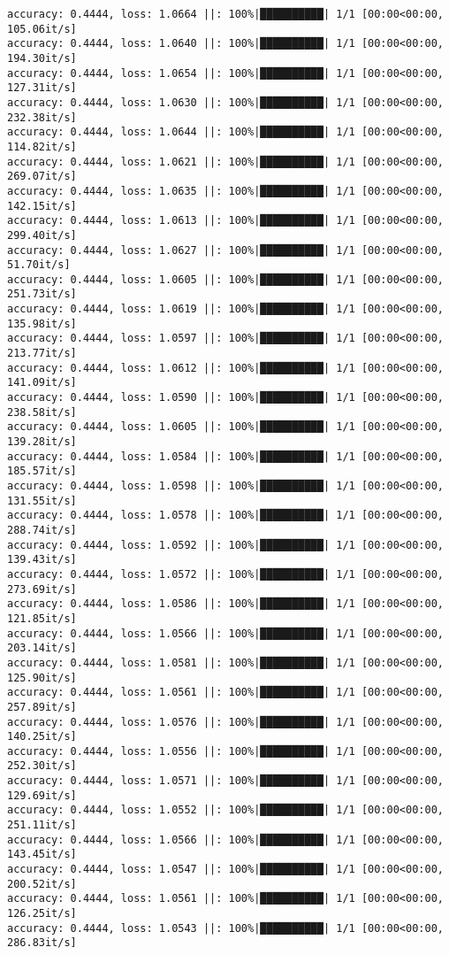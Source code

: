 \documentclass[
]{article}
\begin{document}
\begin{verbatim}
accuracy: 0.4444, loss: 1.0664 ||: 100%|██████████| 1/1 [00:00<00:00, 105.06it/s]
accuracy: 0.4444, loss: 1.0640 ||: 100%|██████████| 1/1 [00:00<00:00, 194.30it/s]
accuracy: 0.4444, loss: 1.0654 ||: 100%|██████████| 1/1 [00:00<00:00, 127.31it/s]
accuracy: 0.4444, loss: 1.0630 ||: 100%|██████████| 1/1 [00:00<00:00, 232.38it/s]
accuracy: 0.4444, loss: 1.0644 ||: 100%|██████████| 1/1 [00:00<00:00, 114.82it/s]
accuracy: 0.4444, loss: 1.0621 ||: 100%|██████████| 1/1 [00:00<00:00, 269.07it/s]
accuracy: 0.4444, loss: 1.0635 ||: 100%|██████████| 1/1 [00:00<00:00, 142.15it/s]
accuracy: 0.4444, loss: 1.0613 ||: 100%|██████████| 1/1 [00:00<00:00, 299.40it/s]
accuracy: 0.4444, loss: 1.0627 ||: 100%|██████████| 1/1 [00:00<00:00, 51.70it/s]
accuracy: 0.4444, loss: 1.0605 ||: 100%|██████████| 1/1 [00:00<00:00, 251.73it/s]
accuracy: 0.4444, loss: 1.0619 ||: 100%|██████████| 1/1 [00:00<00:00, 135.98it/s]
accuracy: 0.4444, loss: 1.0597 ||: 100%|██████████| 1/1 [00:00<00:00, 213.77it/s]
accuracy: 0.4444, loss: 1.0612 ||: 100%|██████████| 1/1 [00:00<00:00, 141.09it/s]
accuracy: 0.4444, loss: 1.0590 ||: 100%|██████████| 1/1 [00:00<00:00, 238.58it/s]
accuracy: 0.4444, loss: 1.0605 ||: 100%|██████████| 1/1 [00:00<00:00, 139.28it/s]
accuracy: 0.4444, loss: 1.0584 ||: 100%|██████████| 1/1 [00:00<00:00, 185.57it/s]
accuracy: 0.4444, loss: 1.0598 ||: 100%|██████████| 1/1 [00:00<00:00, 131.55it/s]
accuracy: 0.4444, loss: 1.0578 ||: 100%|██████████| 1/1 [00:00<00:00, 288.74it/s]
accuracy: 0.4444, loss: 1.0592 ||: 100%|██████████| 1/1 [00:00<00:00, 139.43it/s]
accuracy: 0.4444, loss: 1.0572 ||: 100%|██████████| 1/1 [00:00<00:00, 273.69it/s]
accuracy: 0.4444, loss: 1.0586 ||: 100%|██████████| 1/1 [00:00<00:00, 121.85it/s]
accuracy: 0.4444, loss: 1.0566 ||: 100%|██████████| 1/1 [00:00<00:00, 203.14it/s]
accuracy: 0.4444, loss: 1.0581 ||: 100%|██████████| 1/1 [00:00<00:00, 125.90it/s]
accuracy: 0.4444, loss: 1.0561 ||: 100%|██████████| 1/1 [00:00<00:00, 257.89it/s]
accuracy: 0.4444, loss: 1.0576 ||: 100%|██████████| 1/1 [00:00<00:00, 140.25it/s]
accuracy: 0.4444, loss: 1.0556 ||: 100%|██████████| 1/1 [00:00<00:00, 252.30it/s]
accuracy: 0.4444, loss: 1.0571 ||: 100%|██████████| 1/1 [00:00<00:00, 129.69it/s]
accuracy: 0.4444, loss: 1.0552 ||: 100%|██████████| 1/1 [00:00<00:00, 251.11it/s]
accuracy: 0.4444, loss: 1.0566 ||: 100%|██████████| 1/1 [00:00<00:00, 143.45it/s]
accuracy: 0.4444, loss: 1.0547 ||: 100%|██████████| 1/1 [00:00<00:00, 200.52it/s]
accuracy: 0.4444, loss: 1.0561 ||: 100%|██████████| 1/1 [00:00<00:00, 126.25it/s]
accuracy: 0.4444, loss: 1.0543 ||: 100%|██████████| 1/1 [00:00<00:00, 286.83it/s]

\end{verbatim}
\end{document}
